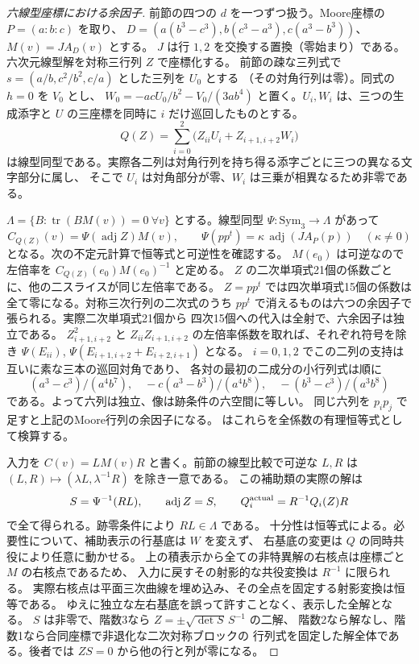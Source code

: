 \begin{proof}[六線型座標における余因子]
前節の四つの $d$ を一つずつ扱う。Moore座標の $P=(a:b:c)$ を取り、
$D=(a(b^3-c^3),b(c^3-a^3),c(a^3-b^3))$、$M(v)=J A_D(v)$ とする。
$J$ は行 $1,2$ を交換する置換（零始まり）である。
六次元線型解を対称三行列 $Z$ で座標化する。
前節の疎な三列式で $s=(a/b,c^2/b^2,c/a)$ とした三列を $U_0$ とする
（その対角行列は零）。同式の $h=0$ を $V_0$ とし、
$W_0=-ac U_0/b^2-V_0/(3ab^4)$ と置く。$U_i,W_i$ は、三つの生成添字と
$U$ の三座標を同時に $i$ だけ巡回したものとする。
\[
            Q(Z)=\sum_{i=0}^2\big(Z_{ii}U_i+Z_{i+1,i+2}W_i\big)
\]
は線型同型である。実際各二列は対角行列を持ち得る添字ごとに三つの異なる文字部分に属し、
そこで $U_i$ は対角部分が零、$W_i$ は三乗が相異なるため非零である。

$\Lambda=\{B:\operatorname{tr}(BM(v))=0\ \forall v\}$ とする。線型同型
$\Psi:\mathrm{Sym}_3\to\Lambda$ があって
\[
        C_{Q(Z)}(v)=\Psi(\operatorname{adj} Z) M(v),\qquad
        \Psi(p p^t)=\kappa\,\operatorname{adj}(J A_P(p))
        \quad(\kappa\ne0)
\]
となる。次の不定元計算で恒等式と可逆性を確認する。
$M(e_0)$ は可逆なので左倍率を $C_{Q(Z)}(e_0)M(e_0)^{-1}$ と定める。
$Z$ の二次単項式21個の係数ごとに、他の二スライスが同じ左倍率である。
$Z=p p^t$ では四次単項式15個の係数は全て零になる。対称三次行列の二次式のうち
$pp^t$ で消えるものは六つの余因子で張られる。実際二次単項式21個から
四次15個への代入は全射で、六余因子は独立である。
$Z_{i+1,i+2}^2$ と $Z_{ii} Z_{i+1,i+2}$ の左倍率係数を取れば、それぞれ符号を除き
$\Psi(E_{ii})$, $\Psi(E_{i+1,i+2}+E_{i+2,i+1})$ となる。
$i=0,1,2$ でこの二列の支持は互いに素な三本の巡回対角であり、
各対の最初の二成分の小行列式は順に
\[
       (a^3-c^3)/(a^4b^7),\quad -c(a^3-b^3)/(a^4b^8),
                      \quad -(b^3-c^3)/(a^3b^8)
\]
である。よって六列は独立、像は跡条件の六空間に等しい。
同じ六列を $p_ip_j$ で足すと上記のMoore行列の余因子になる。
はこれらを全係数の有理恒等式として検算する。

入力を $C(v)=L M(v)R$ と書く。前節の線型比較で可逆な $L,R$ は
$(L,R)\mapsto(\lambda L,\lambda^{-1}R)$ を除き一意である。
この補助類の実際の解は
\[
       S=\Psi^{-1}(RL),\qquad \operatorname{adj} Z=S,\qquad
                      Q_i^{\rm actual}=R^{-1} Q_i(Z) R
\]
で全て得られる。跡零条件により $RL\in\Lambda$ である。
十分性は恒等式による。必要性について、補助表示の行基底は $W$ を変えず、
右基底の変更は $Q$ の同時共役により任意に動かせる。
上の積表示から全ての非特異解の右核点は座標ごと $M$ の右核点であるため、
入力に戻すその射影的な共役変換は $R^{-1}$ に限られる。
実際右核点は平面三次曲線を埋め込み、その全点を固定する射影変換は恒等である。
ゆえに独立な左右基底を誤って許すことなく、表示した全解となる。
$S$ は非零で、階数3なら $Z=\pm\sqrt{\det S}\,S^{-1}$ の二解、
階数2なら解なし、階数1なら合同座標で非退化な二次対称ブロックの
行列式を固定した解全体である。後者では $ZS=0$ から他の行と列が零になる。
\end{proof}

